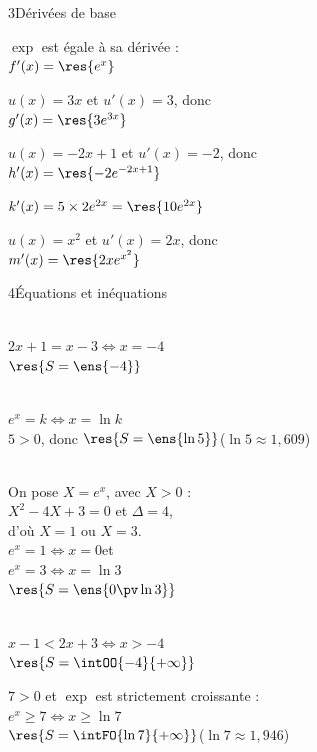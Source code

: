 \begin{deuxcolonnes}
\begin{corrige}{3}{Dérivées de base}
\begin{questions}
  \item $\exp$ est égale à sa dérivée :\\ $f'(x)=\res{e^{x}}$
  \item $u(x)=3x$ et $u'(x)=3$, donc\\ $g'(x)=\res{3e^{3x}}$
  \item $u(x)=-2x+1$ et $u'(x)=-2$, donc\\ $h'(x)=\res{-2e^{-2x+1}}$
  \item $k'(x)=5\times 2e^{2x}=\res{10e^{2x}}$
  \item $u(x)=x^{2}$ et $u'(x)=2x$, donc\\ $m'(x)=\res{2xe^{x^{2}}}$
\end{questions}
\end{corrige}

\begin{corrige}{4}{Équations et inéquations}
\begin{questions}
  \item {}\\
    $2x+1=x-3\iff x=-4$\\
    $\res{S=\ens{-4}}$
  \item {}\\
    $e^{x}=k\iff x=\ln k$\\
    $5>0$, donc $\res{S=\ens{\ln 5}}$\enspace($\ln5\approx1{,}609$)
  \item {}\\
    On pose $X=e^{x}$, avec $X>0$ :\\
    $X^{2}-4X+3=0$ et $\Delta=4$,\\
    d'où $X=1$ ou $X=3$.\\
    $e^{x}=1\iff x=0$\enspace et\\ $e^{x}=3\iff x=\ln3$\\
    $\res{S=\ens{0\pv\ln3}}$
  \item {}\\
    $x-1<2x+3\iff x>-4$\\
    $\res{S=\intOO{-4}{+\infty}}$
  \item $7>0$ et $\exp$ est strictement croissante :\\
    $e^{x}\geq7\iff x\geq\ln7$\\
    $\res{S=\intFO{\ln7}{+\infty}}$\enspace($\ln7\approx1{,}946$)
\end{questions}
\end{corrige}


\end{deuxcolonnes}
